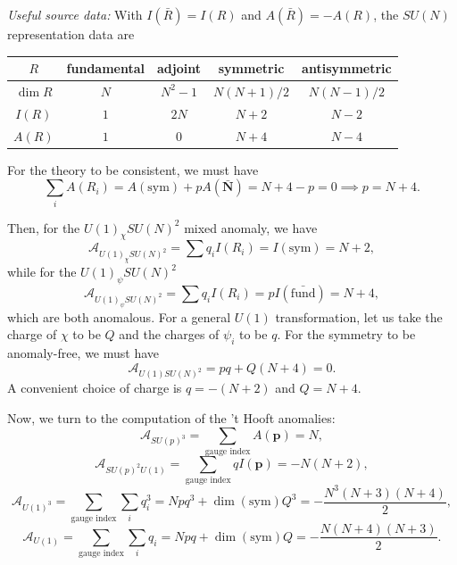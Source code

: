 \textit{Useful source data:} With $I(\bar R)=I(R)$ and
$A(\bar R)=-A(R)$, the $SU(N)$ representation data are
\begin{center}
\begin{tabular}{c|cccc}
    $R$ & fundamental & adjoint & symmetric & antisymmetric\\ \hline
    $\dim R$ & $N$ & $N^2-1$ & $N(N+1)/2$ & $N(N-1)/2$\\
    $I(R)$ & $1$ & $2N$ & $N+2$ & $N-2$\\
    $A(R)$ & $1$ & $0$ & $N+4$ & $N-4$
\end{tabular}
\end{center}
\begin{solution}
    For the theory to be consistent, we must have
    \begin{equation}
        \sum_i A(R_i) = A(\mathrm{sym}) + pA(\bar{\mathbf{N}}) = N+4 -p = 0 \implies p = N+4.
    \end{equation}

    Then, for the $U(1)_\chi SU(N)^2$ mixed anomaly, we have
    \begin{equation}
        \mathcal{A}_{U(1)_\chi SU(N)^2} = \sum q_i I(R_i) = I(\mathrm{sym}) = N+2,
    \end{equation}
    while for the $U(1)_\psi SU(N)^2$
    \begin{equation}
        \mathcal{A}_{U(1)_\psi SU(N)^2} = \sum q_i I(R_i) = pI(\bar{\mathrm{fund}}) = N+4,
    \end{equation}
    which are both anomalous. For a general $U(1)$ transformation, let us take the charge of $\chi$ to be $Q$ and the charges of $\psi_i$ to be $q$. For the symmetry to be anomaly-free, we must have
    \begin{equation}
        \mathcal{A}_{U(1) SU(N)^2} = pq + Q(N+4) = 0.
    \end{equation}
    A convenient choice of charge is $ q= -(N+2)$ and $Q = N+4$.

    Now, we turn to the computation of the 't Hooft anomalies:
    \begin{equation}
        \mathcal{A}_{SU(p)^3} = \sum_{\text{gauge index}} A(\mathbf{p}) = N,
    \end{equation}
    \begin{equation}
        \mathcal{A}_{SU(p)^2U(1)} = \sum_{\text{gauge index}}q I(\mathbf{p}) = -N(N+2),
    \end{equation}
    \begin{equation}
        \mathcal{A}_{U(1)^3} = \sum_{\text{gauge index}} \sum_i q^3_i = Npq^3 + \dim(\mathrm{sym}) Q^3 = -\frac{N^3(N+3)(N+4)}{2},
    \end{equation}
    \begin{equation}
        \mathcal{A}_{U(1)} = \sum_{\text{gauge index}} \sum_i q_i = Npq + \dim(\mathrm{sym}) Q = -\frac{N(N+4)(N+3)}{2}.
    \end{equation}


\end{solution}
